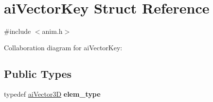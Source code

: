 \hypertarget{structai_vector_key}{\section{ai\-Vector\-Key Struct Reference}
\label{structai_vector_key}
}


{\ttfamily \#include $<$anim.\-h$>$}



Collaboration diagram for ai\-Vector\-Key\-:
\subsection*{Public Types}
\begin{DoxyCompactItemize}
\item 
\hypertarget{structai_vector_key_a8fd33dd13a0673c9947af23c37a673bc}{typedef \hyperlink{structai_vector3_d}{ai\-Vector3\-D} {\bfseries elem\-\_\-type}}\label{structai_vector_key_a8fd33dd13a0673c9947af23c37a673bc}

\end{DoxyCompactItemize}
